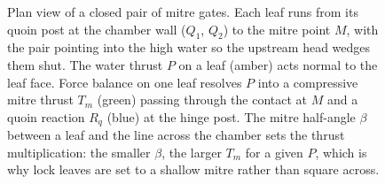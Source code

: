 \begin{figure}[htbp]
\caption[Plan of a mitre lock gate]{Plan view of a closed pair of mitre
gates. Each leaf runs from its quoin post at the chamber wall ($Q_1$, $Q_2$)
to the mitre point $M$, with the pair pointing into the high water so the
upstream head wedges them shut. The water thrust $P$ on a leaf (amber) acts
normal to the leaf face. Force balance on one leaf resolves $P$ into a
compressive mitre thrust $T_m$ (green) passing through the contact at $M$ and
a quoin reaction $R_q$ (blue) at the hinge post. The mitre half-angle
$\beta$ between a leaf and the line across the chamber sets the thrust
multiplication: the smaller $\beta$, the larger $T_m$ for a given $P$, which
is why lock leaves are set to a shallow mitre rather than square across.}
\label{fig:vol03ch10:lock-gate}
\end{figure}
